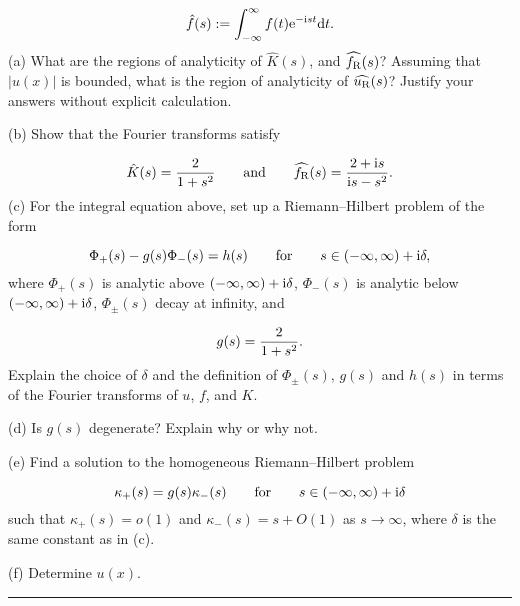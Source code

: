 \documentclass[12pt,a4paper]{article}
\def\qqand{\qquad\hbox{and}\qquad}
\def\qqfor{\qquad\hbox{for}\qquad}
\def\D{ {\rm d} }
\def\I{ {\rm i} }
\def\E{ {\rm e} }
\def\dt{\D t}
\def\endash{–}
\begin{document}
\[
\hat f(s) := \int_{-\infty}^\infty f(t) \E^{- \I s t} \dt.
\]
(a) What are the regions of analyticity of $\hat K(s)$,  and $\widehat{f_{\rm R}}(s)$? Assuming that  $|u(x)|$ is bounded, what is the region of analyticity of $\widehat{u_{\rm R}}(s)$?  Justify your answers without explicit calculation.

(b) Show that the Fourier transforms satisfy

\[
\hat K(s) = {2 \over 1 + s^2}
\qqand
\widehat{f_{\rm R}}(s)= {2 + \I s \over \I s - s^2}.
\]
(c) For the integral equation above, set up a Riemann\ensuremath{\endash}Hilbert problem of the form

\[
\Phi_+(s) - g(s) \Phi_-(s) = h(s) \qqfor s \in (-\infty, \infty ) + \I \delta,
\]
where $\Phi_+(s)$ is analytic above $(-\infty, \infty ) + \I \delta$, $\Phi_-(s)$ is analytic below $(-\infty, \infty ) + \I \delta$, $\Phi_{\pm}(s)$ decay at infinity, and

\[
g(s) = {2 \over 1 + s^2}.
\]
Explain  the choice of $\delta$ and the definition of $\Phi_\pm(s)$, $g(s)$ and $h(s)$ in terms of the Fourier transforms of $u$, $f$, and $K$.

(d) Is $g(s)$  degenerate? Explain why or why not.

(e) Find a  solution to the homogeneous Riemann\ensuremath{\endash}Hilbert problem

\[
\kappa_+(s) = g(s) \kappa_-(s) \qqfor s \in (-\infty,\infty) + \I \delta
\]
such that $\kappa_+(s)= o(1)$ and $\kappa_-(s) = s + O(1)$ as $s \rightarrow \infty$, where $\delta$ is the same constant as in (c).

(f) Determine $u(x)$.

\rule{\textwidth}{1pt}
\end{document}
